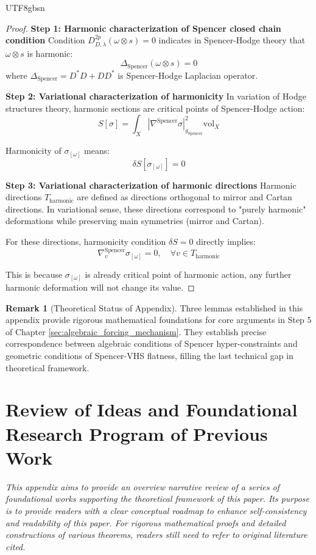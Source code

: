 \documentclass[a4paper,12pt]{extarticle}
\theoremstyle{definition}
\newtheorem{remark}{Remark}[section]
\begin{document}
\begin{CJK}{UTF8}{gbsn}
\begin{proof}
\textbf{Step 1: Harmonic characterization of Spencer closed chain condition}
Condition $D^{2p}_{D,\lambda}(\omega \otimes s) = 0$ indicates in Spencer-Hodge theory that $\omega \otimes s$ is harmonic:
$$\Delta_{\text{Spencer}}(\omega \otimes s) = 0$$
where $\Delta_{\text{Spencer}} = D^* D + D D^*$ is Spencer-Hodge Laplacian operator.

\textbf{Step 2: Variational characterization of harmonicity}
In variation of Hodge structures theory, harmonic sections are critical points of Spencer-Hodge action:
$$S[\sigma] = \int_X |\nabla^{\text{Spencer}} \sigma|^2_{g_{\text{Spencer}}} \text{vol}_X$$

Harmonicity of $\sigma_{[\omega]}$ means:
$$\delta S[\sigma_{[\omega]}] = 0$$

\textbf{Step 3: Variational characterization of harmonic directions}
Harmonic directions $T_{\text{harmonic}}$ are defined as directions orthogonal to mirror and Cartan directions. In variational sense, these directions correspond to "purely harmonic" deformations while preserving main symmetries (mirror and Cartan).

For these directions, harmonicity condition $\delta S = 0$ directly implies:
$$\nabla^{\text{Spencer}}_{v} \sigma_{[\omega]} = 0, \quad \forall v \in T_{\text{harmonic}}$$

This is because $\sigma_{[\omega]}$ is already critical point of harmonic action, any further harmonic deformation will not change its value.
\end{proof}

\begin{remark}[Theoretical Status of Appendix]
Three lemmas established in this appendix provide rigorous mathematical foundations for core arguments in Step 5 of Chapter \ref{sec:algebraic_forcing_mechanism}. They establish precise correspondence between algebraic conditions of Spencer hyper-constraints and geometric conditions of Spencer-VHS flatness, filling the last technical gap in theoretical framework.
\end{remark}

\section{Review of Ideas and Foundational Research Program of Previous Work}
\label{app:appendix_roadmap}

\textit{This appendix aims to provide an overview narrative review of a series of foundational works supporting the theoretical framework of this paper. Its purpose is to provide readers with a clear conceptual roadmap to enhance self-consistency and readability of this paper. For rigorous mathematical proofs and detailed constructions of various theorems, readers still need to refer to original literature cited.}


\end{CJK}
\end{document}
